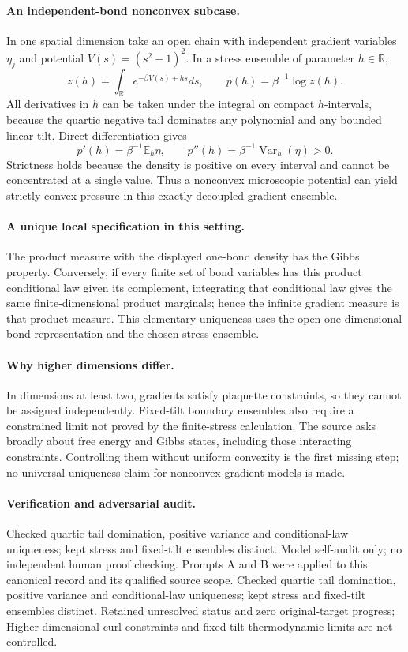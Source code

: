 \documentclass[11pt]{article}
\begin{document}
\paragraph{An independent-bond nonconvex subcase.} In one spatial dimension take an open chain with independent gradient variables $\eta_j$ and potential $V(s)=(s^2-1)^2$. In a stress ensemble of parameter $h\in\mathbb R$,
\[
 z(h)=\int_{\mathbb R}e^{-\beta V(s)+hs}ds,\qquad p(h)=\beta^{-1}\log z(h).
\]
All derivatives in $h$ can be taken under the integral on compact $h$-intervals, because the quartic negative tail dominates any polynomial and any bounded linear tilt. Direct differentiation gives
\[
 p'(h)=\beta^{-1}\mathbb E_h\eta,\qquad
 p''(h)=\beta^{-1}\operatorname{Var}_h(\eta)>0.
\]
Strictness holds because the density is positive on every interval and cannot be concentrated at a single value. Thus a nonconvex microscopic potential can yield strictly convex pressure in this exactly decoupled gradient ensemble.

\paragraph{A unique local specification in this setting.} The product measure with the displayed one-bond density has the Gibbs property. Conversely, if every finite set of bond variables has this product conditional law given its complement, integrating that conditional law gives the same finite-dimensional product marginals; hence the infinite gradient measure is that product measure. This elementary uniqueness uses the open one-dimensional bond representation and the chosen stress ensemble.

\paragraph{Why higher dimensions differ.} In dimensions at least two, gradients satisfy plaquette constraints, so they cannot be assigned independently. Fixed-tilt boundary ensembles also require a constrained limit not proved by the finite-stress calculation. The source asks broadly about free energy and Gibbs states, including those interacting constraints. Controlling them without uniform convexity is the first missing step; no universal uniqueness claim for nonconvex gradient models is made.

\paragraph{Verification and adversarial audit.}
Checked quartic tail domination, positive variance and conditional-law uniqueness; kept stress and fixed-tilt ensembles distinct. Model self-audit only; no independent human proof checking. Prompts A and B were applied to this canonical record and its qualified source scope. Checked quartic tail domination, positive variance and conditional-law uniqueness; kept stress and fixed-tilt ensembles distinct. Retained unresolved status and zero original-target progress; Higher-dimensional curl constraints and fixed-tilt thermodynamic limits are not controlled.
\end{document}
